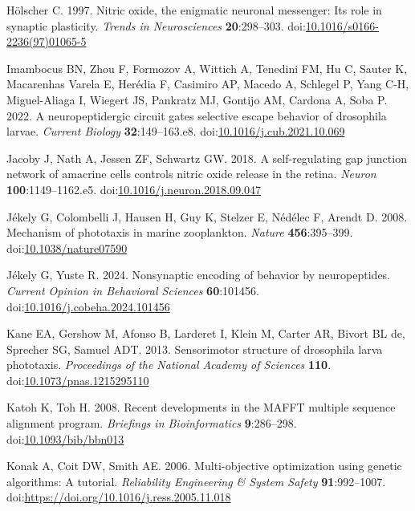 \documentclass[
  11pt,
  letterpaper,
  DIV=11,
  numbers=noendperiod]{scrartcl}
\newlength{\cslhangindent}
\newenvironment{CSLReferences}[2] %
 {\begin{list}{}{%
  \setlength{\itemindent}{0pt}
  \setlength{\leftmargin}{0pt}
  \setlength{\parsep}{0pt}
  \ifodd #1
   \setlength{\leftmargin}{\cslhangindent}
   \setlength{\itemindent}{-1\cslhangindent}
  \fi
  \setlength{\itemsep}{#2\baselineskip}}}
 {\end{list}}
\begin{document}
\begin{CSLReferences}{1}{0}
Hölscher C. 1997. Nitric oxide, the enigmatic neuronal messenger: Its
role in synaptic plasticity. \emph{Trends in Neurosciences}
\textbf{20}:298--303.
doi:\href{https://doi.org/10.1016/s0166-2236(97)01065-5}{10.1016/s0166-2236(97)01065-5}

Imambocus BN, Zhou F, Formozov A, Wittich A, Tenedini FM, Hu C, Sauter
K, Macarenhas Varela E, Herédia F, Casimiro AP, Macedo A, Schlegel P,
Yang C-H, Miguel-Aliaga I, Wiegert JS, Pankratz MJ, Gontijo AM, Cardona
A, Soba P. 2022. A neuropeptidergic circuit gates selective escape
behavior of drosophila larvae. \emph{Current Biology}
\textbf{32}:149--163.e8.
doi:\href{https://doi.org/10.1016/j.cub.2021.10.069}{10.1016/j.cub.2021.10.069}

Jacoby J, Nath A, Jessen ZF, Schwartz GW. 2018. A self-regulating gap
junction network of amacrine cells controls nitric oxide release in the
retina. \emph{Neuron} \textbf{100}:1149--1162.e5.
doi:\href{https://doi.org/10.1016/j.neuron.2018.09.047}{10.1016/j.neuron.2018.09.047}

Jékely G, Colombelli J, Hausen H, Guy K, Stelzer E, Nédélec F, Arendt D.
2008. Mechanism of phototaxis in marine zooplankton. \emph{Nature}
\textbf{456}:395--399.
doi:\href{https://doi.org/10.1038/nature07590}{10.1038/nature07590}

Jékely G, Yuste R. 2024. Nonsynaptic encoding of behavior by
neuropeptides. \emph{Current Opinion in Behavioral Sciences}
\textbf{60}:101456.
doi:\href{https://doi.org/10.1016/j.cobeha.2024.101456}{10.1016/j.cobeha.2024.101456}

Kane EA, Gershow M, Afonso B, Larderet I, Klein M, Carter AR, Bivort BL
de, Sprecher SG, Samuel ADT. 2013. Sensorimotor structure of drosophila
larva phototaxis. \emph{Proceedings of the National Academy of Sciences}
\textbf{110}.
doi:\href{https://doi.org/10.1073/pnas.1215295110}{10.1073/pnas.1215295110}

Katoh K, Toh H. 2008. Recent developments in the MAFFT multiple sequence
alignment program. \emph{Briefings in Bioinformatics}
\textbf{9}:286--298.
doi:\href{https://doi.org/10.1093/bib/bbn013}{10.1093/bib/bbn013}

Konak A, Coit DW, Smith AE. 2006. Multi-objective optimization using
genetic algorithms: A tutorial. \emph{Reliability Engineering \& System
Safety} \textbf{91}:992--1007.
doi:\url{https://doi.org/10.1016/j.ress.2005.11.018}


\end{CSLReferences}
\end{document}
